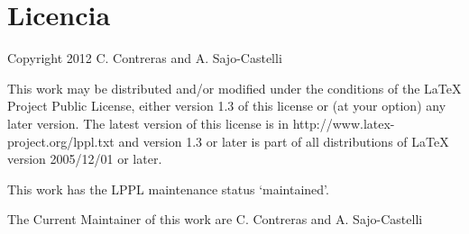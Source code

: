 \chapter{Licencia}
\label{appendix:Licencia}
Copyright 2012 C. Contreras and A. Sajo-Castelli
  
  This work may be distributed and/or modified under the
  conditions of the LaTeX Project Public License, either version 1.3
  of this license or (at your option) any later version.
  The latest version of this license is in
    http://www.latex-project.org/lppl.txt
  and version 1.3 or later is part of all distributions of LaTeX
  version 2005/12/01 or later.
  
  This work has the LPPL maintenance status `maintained'.
  
  The Current Maintainer of this work are C. Contreras and A. Sajo-Castelli